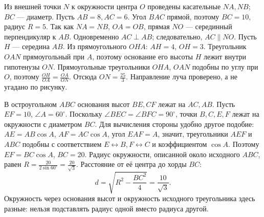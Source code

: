\begin{example}\label{ex:review-ege-exam-plane-2}
Из внешней точки \(N\) к окружности центра \(O\) проведены касательные \(NA,NB\); \(BC\) — диаметр. Пусть \(AB=8,AC=6\). Угол \(BAC\) прямой, поэтому \(BC=10\), радиус \(R=5\). Так как \(NA=NB\), \(OA=OB\), прямая \(NO\) — серединный перпендикуляр к \(AB\). Одновременно \(AC\perp AB\); следовательно, \(AC\parallel NO\).
Пусть \(H\) — середина \(AB\). Из прямоугольного \(OHA\): \(AH=4\), \(OH=3\). Треугольник \(OAN\) прямоугольный при \(A\), поэтому основание его высоты \(H\) лежит внутри гипотенузы \(ON\). Прямоугольные треугольники \(OHA\), \(OAN\) подобны по углу при \(O\), поэтому \(\frac{OH}{OA}=\frac{OA}{ON}\). Отсюда \(ON=\frac{25}{3}\). Направление луча проверено, а не угадано по рисунку.
\end{example}

\begin{example}\label{ex:review-ege-exam-plane-3}
В остроугольном \(ABC\) основания высот \(BE,CF\) лежат на \(AC,AB\). Пусть \(EF=10\), \(\angle A=60^\circ\). Поскольку \(\angle BEC=\angle BFC=90^\circ\), точки \(B,C,E,F\) лежат на окружности с диаметром \(BC\). Для вычисления стороны удобно другое подобие: \(AE=AB\cos A\), \(AF=AC\cos A\), угол \(EAF=A\), значит, треугольники \(AEF\) и \(ABC\) подобны с соответствием \(E\leftrightarrow B,F\leftrightarrow C\) и коэффициентом \(\cos A\). Поэтому \(EF=BC\cos A\), \(BC=20\). Радиус окружности, описанной около исходного \(ABC\), равен \(R=\frac{20}{2\sin60^\circ}=\frac{20}{\sqrt3}\). Расстояние от её центра до хорды \(BC\):
\[
d=\sqrt{R^2-\frac{BC^2}{4}}=\frac{10}{\sqrt3}.
\]
Окружность через основания высот и окружность исходного треугольника здесь разные: нельзя подставлять радиус одной вместо радиуса другой.
\end{example}
